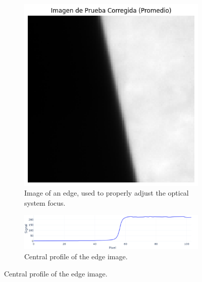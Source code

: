 \begin{figure}[H]
    \centering
    \begin{subfigure}[b]{0.7\linewidth}
        \centering
        \includegraphics[trim=0mm 0mm 0mm 10mm, clip, width=\linewidth]{Figures/C3/SE_1.png}
        \caption{Image of an edge, used to properly adjust the optical system focus.}
        \label{fig:enfoque}
    \end{subfigure}
    
    \vspace{1em} %

    \begin{subfigure}[b]{0.95\linewidth}
        \centering
        \includegraphics[width=\linewidth]{Figures/C3/SE_signal.png}
        \caption{Central profile of the edge image.}
        \label{fig:se_signal}
    \end{subfigure}
    
    \vspace{1em} %


\end{figure}
